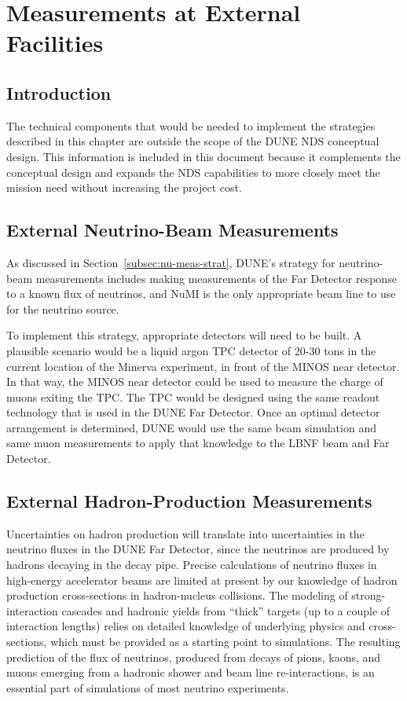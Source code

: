 
\chapter{Measurements at External Facilities}
\label{ch:nd-external-meas}

\section{Introduction}

The technical components that would be needed to implement the strategies 
described in this chapter are outside the scope of the DUNE NDS conceptual 
design. This information is included in this document because it complements the conceptual 
design and expands the NDS capabilities to more closely meet the mission need without increasing the project cost.


\section{External Neutrino-Beam Measurements}
\label{sec:nd-external-beam}

As discussed in Section~\ref{subsec:nu-meas-strat}, DUNE's strategy for neutrino-beam measurements includes making measurements of the Far Detector response to a known flux of neutrinos, and NuMI is the only appropriate beam line to use for the neutrino source.

To implement this strategy, appropriate detectors will need to be built.  A plausible scenario would be a liquid argon TPC detector of 20-30 tons in the current location of the Minerva experiment, in front of the MINOS near detector. In that way, the MINOS near detector could be used to measure the charge of muons exiting the TPC. The TPC would be designed using the same readout technology that is used in the DUNE Far Detector.  Once an optimal detector arrangement is determined, DUNE would use the same beam simulation and same muon measurements to apply that knowledge to the LBNF beam and Far Detector.

\section{External Hadron-Production Measurements}
\label{sec:nd-external-hadron}

Uncertainties on hadron production will translate into uncertainties in the neutrino fluxes
in the DUNE Far Detector, since the neutrinos are produced by hadrons decaying in the decay pipe. Precise calculations of neutrino fluxes in high-energy accelerator beams are limited
at present by our knowledge of hadron production cross-sections in hadron-nucleus collisions. 
The modeling of strong-interaction cascades and hadronic yields from ``thick'' targets
(up to a couple of interaction lengths) relies on detailed knowledge of underlying physics
and cross-sections, which must be provided as a starting point to simulations. The resulting 
prediction of the flux of neutrinos, produced from decays of pions, kaons, and muons
emerging from a hadronic shower and beam line re-interactions, is an essential part
of simulations of most neutrino experiments. 

